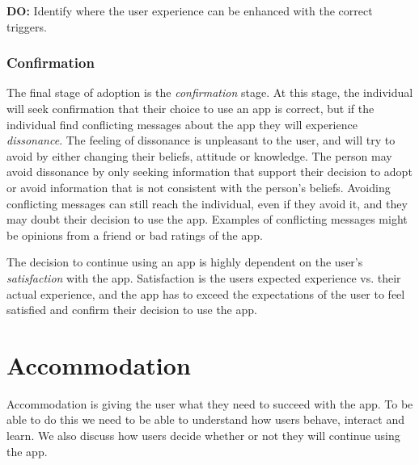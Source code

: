 \begin{displayquote}
  \textbf{DO:} Identify where the user experience can be enhanced with the correct triggers.
\end{displayquote}

\subsubsection{Confirmation}

The final stage of adoption is the \textit{confirmation} stage. At this stage, the individual will seek confirmation that their choice to use an app is correct, but if the individual find conflicting messages about the app they will experience \textit{dissonance}. The feeling of dissonance is unpleasant to the user, and will try to avoid by either changing their beliefs, attitude or knowledge. The person may avoid dissonance by only seeking information that support their decision to adopt or avoid information that is not consistent with the person's beliefs. Avoiding conflicting messages can still reach the individual, even if they avoid it, and they may doubt their decision to use the app. Examples of conflicting messages might be opinions from a friend or bad ratings of the app.

The decision to continue using an app is highly dependent on the user's \textit{satisfaction} with the app. Satisfaction is the users expected experience vs. their actual experience, and the app has to exceed the expectations of the user to feel satisfied and confirm their decision to use the app.

%

\section{Accommodation}
Accommodation is giving the user what they need to succeed with the app. To be able to do this we need to be able to understand how users behave, interact and learn. We also discuss how users decide whether or not they will continue using the app.

